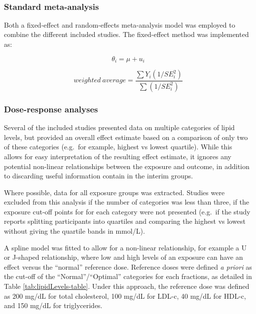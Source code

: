 \documentclass[a4paper, twoside]{templates/ociamthesis}
\begin{document}
~

\hypertarget{standard-meta-analysis}{%
\subsubsection{Standard meta-analysis}\label{standard-meta-analysis}}

Both a fixed-effect and random-effects meta-analysis model was employed to combine the different included studies. The fixed-effect method was implemented as:

\begin{equation}
  \theta_i = \mu + u_i
  \label{eq:meta-analysis-random}
\end{equation}

\begin{equation}
  weighted\ average = \frac{\sum Y_i (1/SE_i^2)}{\sum(1/SE_i^2)}
  \label{eq:meta-analysis-fixed}
\end{equation}

\hypertarget{dose-response-analyses}{%
\subsubsection{Dose-response analyses}\label{dose-response-analyses}}

Several of the included studies presented data on multiple categories of lipid levels, but provided an overall effect estimate based on a comparison of only two of these categories (e.g.~for example, highest vs lowest quartile). While this allows for easy interpretation of the resulting effect estimate, it ignores any potential non-linear relationships between the exposure and outcome, in addition to discarding useful information contain in the interim groups.

Where possible, data for all exposure groups was extracted. Studies were excluded from this analysis if the number of categories was less than three, if the exposure cut-off points for for each category were not presented (e.g.~if the study reports splitting participants into quartiles and comparing the highest vs lowest without giving the quartile bands in mmol/L).

A spline model was fitted to allow for a non-linear relationship, for example a U or J-shaped relationship, where low and high levels of an exposure can have an effect versus the ``normal'' reference dose. Reference doses were defined \emph{a priori} as the cut-off of the ``Normal''/``Optimal'' categories for each fractions, as detailed in Table \ref{tab:lipidLevels-table}. Under this approach, the reference dose was defined as 200 mg/dL for total cholesterol, 100 mg/dL for LDL-c, 40 mg/dL for HDL-c, and 150 mg/dL for triglycerides.
\end{document}
